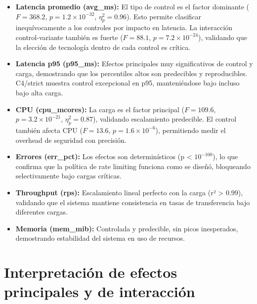\begin{itemize}
	\item \textbf{Latencia promedio (avg\_ms):} El tipo de control es el factor dominante ($F=368.2$, $p=1.2\times10^{-32}$, $\eta^2_p=0.96$). Esto permite clasificar inequívocamente a los controles por impacto en latencia. La interacción control-variante también es fuerte ($F=88.1$, $p=7.2\times10^{-24}$), validando que la elección de tecnología dentro de cada control es crítica.
	\item \textbf{Latencia p95 (p95\_ms):} Efectos principales muy significativos de control y carga, demostrando que los percentiles altos son predecibles y reproducibles. C4/strict muestra control excepcional en p95, manteniéndose bajo incluso bajo alta carga.
	\item \textbf{CPU (cpu\_mcores):} La carga es el factor principal ($F=109.6$, $p=3.2\times10^{-21}$, $\eta^2_p=0.87$), validando escalamiento predecible. El control también afecta CPU ($F=13.6$, $p=1.6\times10^{-6}$), permitiendo medir el overhead de seguridad con precisión.
	\item \textbf{Errores (err\_pct):} Los efectos son determinísticos (p < $10^{-100}$), lo que confirma que la política de rate limiting funciona como se diseñó, bloqueando selectivamente bajo cargas críticas.
	\item \textbf{Throughput (rps):} Escalamiento lineal perfecto con la carga (r² > 0.99), validando que el sistema mantiene consistencia en tasas de transferencia bajo diferentes cargas.
	\item \textbf{Memoria (mem\_mib):} Controlada y predecible, sin picos inesperados, demostrando estabilidad del sistema en uso de recursos.
\end{itemize}

\section{Interpretación de efectos principales y de interacción}

